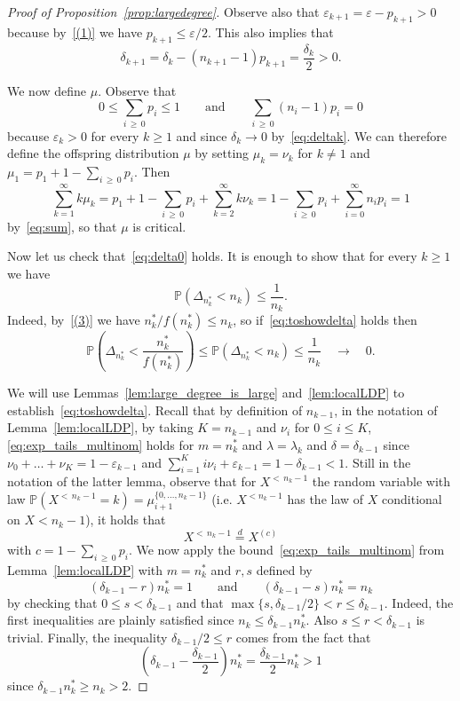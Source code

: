 \documentclass[AHL,Unicode,longabstracts,published]{cedram}
\renewcommand{\P}{\mathbb{P}}
\begin{document}
\begin{proof}[Proof of Proposition~\ref{prop:largedegree}]
Observe also that $\varepsilon_{k+1}=\varepsilon-p_{k+1}>0$ because by~\eqref{(1)} we have $ p_{k+1}\leq \varepsilon/2$. This also implies that
\begin{equation}\label{eq:deltak}
\delta_{k+1}=\delta_{k}- (n_{k+1}-1) p_{k+1}=\frac{\delta_{k}}{2}>0.
\end{equation}

We now define $\mu$. Observe that
\begin{equation}\label{eq:sum}
0 \leq \sum_{i\,\geq\,0} p_i\le 1 \qquad \text{and} \qquad \sum_{i\,\geq\,0}(n_i-1) p_i =0
\end{equation}
because $\varepsilon_{k}>0$ for every $k \geq 1$ and since $\delta_{k} \rightarrow 0$ by~\eqref{eq:deltak}. We can therefore define the offspring distribution $\mu$ by setting $\mu_{k}=\nu_{k}$ for $k \neq 1$ and $\mu_1=p_1+1-\sum_{i\,\geq\,0}p_i$. Then
\[
\sum_{k=1}^{\infty} k \mu_{k}=p_1+1-\sum_{i\,\geq\,0}p_i+\sum_{k=2}^{\infty} k \nu_{k}=1-\sum_{i\,\geq\,0}p_i+\sum_{i=0}^{\infty} n_{i} {p_{i}}=1
\]
by~\eqref{eq:sum}, so that $\mu$ is critical.

Now let us check that~\eqref{eq:delta0} holds. It is enough to show that for every $k \geq 1$ we have
\begin{equation}\label{eq:toshowdelta}
\P\left(\Delta_{n_{k}^*}< n_{k}\right) \leq \frac{1}{n_{k}}.
\end{equation}
Indeed, by~\eqref{(3)} we have $n_{k}^*/f(n_{k}^*) \leq n_{k}$, so if~\eqref{eq:toshowdelta} holds then
\[
\P\left(\Delta_{n_{k}^*}< \frac{n_{k}^*}{f(n_{k}^*)} \right)\leq \P\left(\Delta_{n_{k}^*}< n_{k}\right) \leq \frac{1}{n_{k}} \quad \longrightarrow \quad 0.
\]

We will use Lemmas~\ref{lem:large_degree_is_large} and~\ref{lem:localLDP} to establish~\eqref{eq:toshowdelta}. Recall that by definition of $n_{k-1}$, in the notation of Lemma~\ref{lem:localLDP}, by taking $K=n_{k-1}$ and $\nu_i$ for $0 \leq i\leq K$, \eqref{eq:exp_tails_multinom} holds for $m=n_{k}^{*}$ and $\lambda=\lambda_{k}$ and $\delta=\delta_{k-1}$ since $\nu_0+\dots+\nu_K=1-\varepsilon_{k-1}$ and $\sum_{i=1}^K i\nu_i+\varepsilon_{k-1}=1-\delta_{k-1}<1$. Still in the notation of the latter lemma, observe that for $X^{<\,n_k-1}$ the random variable with law $\P(X^{<\,n_k-1}=k)=\mu^{\{0,\dots, n_k-1\}}_{i+1}$ (i.e. $X^{<n_k-1}$ has the law of $X$ conditional on $X<n_k-1$), it holds that
\[
X^{<\,n_{k}-1}\overset{d}{=}X^{(c)}
\]
with $c=1-\sum_{i\,\geq\,0} p_i$. We now apply the bound~\eqref{eq:exp_tails_multinom} from Lemma~\ref{lem:localLDP} with $m=n_{k}^*$ and $r,s$ defined by
\[
(\delta_{k-1}-r)n_{k}^*=1 \qquad \text{and} \qquad (\delta_{k-1}-s)n_{k}^*=n_{k}
\]
by checking that $0\leq s <\delta_{k-1}$ and that $\max\{s,\delta_{k-1}/2\}< r\le \delta_{k-1} $. Indeed, the first inequalities are plainly satisfied since $n_k\leq \delta_{k-1} n^*_k$. Also $s \leq r<\delta_{k-1}$ is trivial. Finally, the inequality $\delta_{k-1}/2 \leq r$ comes from the fact that
\[
\left(\delta_{k-1}- \frac{\delta_{k-1}}{2} \right)n_{k}^*= \frac{\delta_{k-1}}{2} n_{k}^*>1
\]
since $\delta_{k-1} n^*_k\ge n_k>2$.


\end{proof}
\end{document}
